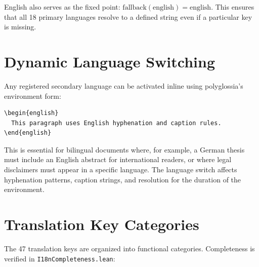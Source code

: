 English also serves as the fixed point: $\text{fallback}(\text{english})
= \text{english}$.  This ensures that all 18 primary languages resolve
to a defined string even if a particular key is missing.

\section{Dynamic Language Switching}

Any registered secondary language can be activated inline using
polyglossia's environment form:

\begin{verbatim}
\begin{english}
  This paragraph uses English hyphenation and caption rules.
\end{english}
\end{verbatim}

This is essential for bilingual documents where, for example, a German thesis
must include an English abstract for international readers, or where legal
disclaimers must appear in a specific language.  The language switch affects
hyphenation patterns, caption strings, and  resolution
for the duration of the environment.

\section{Translation Key Categories}

The 47 translation keys are organized into functional categories.
Completeness is verified in \texttt{I18nCompleteness.lean}:

